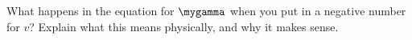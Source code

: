 What happens in the equation for $\mygamma$ when you put in a negative number for $v$? Explain
what this means physically, and why it makes sense.

